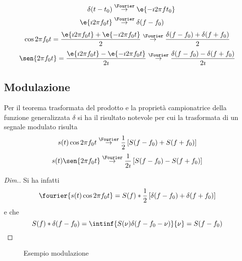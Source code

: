 \begin{align*}
	\delta(t-t_0)&\overset{\Fourier}{\to}\e{-\imath 2\pi f t_0}\\
	\e{\imath 2\pi f_0 t}&\overset{\Fourier}{\to}\delta(f-f_0)
\end{align*}
\begin{equation}
	\cos{2\pi f_0 t}=\frac{\e{\imath 2\pi f_0 t}+\e{-\imath 2\pi f_0 t}}{2}\overset{\Fourier}{\to}\frac{\delta(f-f_0)+\delta(f+f_0)}{2}
\end{equation}
\begin{equation}
	\sen{2\pi f_0 t}=\frac{\e{\imath 2\pi f_0 t}-\e{-\imath 2\pi f_0 t}}{2\imath}\overset{\Fourier}{\to}\frac{\delta(f-f_0)-\delta(f+f_0)}{2\imath}
\end{equation}

\subsection{Modulazione}
Per il teorema trasformata del prodotto e la proprietà campionatrice della funzione generalizzata $\delta$ si ha il risultato notevole per cui la trasformata di un segnale modulato risulta
\begin{equation}
\label{eq:fourier_modulazione_coseno}
	s(t)\cos{2\pi f_0 t}\overset{\Fourier}{\to}\frac{1}{2}\left[S(f-f_0)+S(f+f_0)\right]
\end{equation}
\begin{equation}
	s(t)\sen{2\pi f_0 t}\overset{\Fourier}{\to}\frac{1}{2\imath}\left[S(f-f_0)-S(f+f_0)\right]
\end{equation}

\begin{proof}[Dim.]
Si ha infatti
\[
	\fourier{s(t)\cos{2\pi f_0 t}}=S(f)\ast\frac{1}{2}\left[\delta(f-f_0)+\delta(f+f_0)\right]
\]
e che 
\[
	S(f)\ast\delta(f-f_0)=\intinf{S(\nu)\delta(f-f_0-\nu)}{\nu}=S(f-f_0)
\qedhere
\]
\end{proof}

\begin{figure}[!ht]
	\centering
	\qquad
	\caption{Esempio modulazione}
\end{figure}

